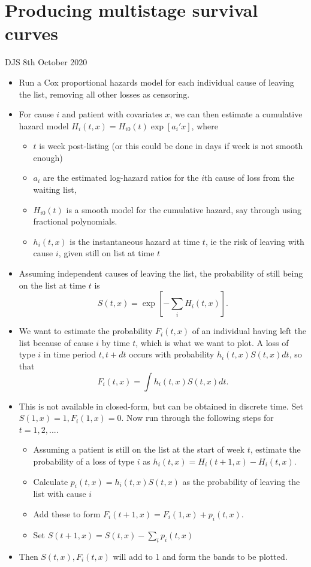\documentclass[12pt]{article}
\begin{document}
\parindent=0pt
\parskip=5pt

\section*{Producing multistage survival curves}
DJS 8th October 2020
\begin{itemize}
\item Run a Cox proportional hazards model for each individual cause of leaving the list, removing all other losses as censoring. 
\item For cause $i$ and patient with covariates $x$, we can then estimate a cumulative hazard model $H_i(t , x) = H_{i0}(t) \exp[ a_i ' x]$, where 
\begin{itemize}
\item $t$ is week post-listing (or this could be done in days if week is not smooth enough)
\item $a_i$ are the estimated log-hazard ratios for the $i$th cause of loss from the waiting list, 
\item  $H_{i0}(t)$ is a smooth model for the cumulative hazard, say through using fractional polynomials.
\item $h_i(t , x)$ is the instantaneous hazard at time $t$, ie the risk of leaving with cause $i$, given still on list at time $t$
\end{itemize}
\item Assuming independent causes of leaving the list, the probability of still being on the list at time $t$ is 
$$ S(t,x) = \exp[ - \sum_i H_i(t , x)].  $$
\item We want to estimate the probability $F_i(t,x)$ of an individual having left the list because of cause $i$ by time $t$, which is what we want to plot.   A loss of type $i$ in time period $t, t+dt$ occurs with probability $  h_i(t , x) S(t,x) dt$, so that 
$$F_i(t,x) = \int h_i(t , x) S(t,x) dt.$$
\item This is not available in closed-form, but can be obtained in discrete time.  Set $S(1,x)=1, F_i(1,x)=0$. Now run through the following steps for $t = 1,2,...$.


\begin{itemize}
\item Assuming a patient is still on the list at the start of week $t$, estimate the probability of a loss of type $i$ as $h_i(t,x) = H_i(t+1 , x) - H_i(t , x) $.  
\item Calculate $p_i(t,x) = h_i(t,x) S(t,x) $ as the probability of leaving the list with cause $i$
\item Add these to form $F_i(t+1,x) = F_i(1,x) + p_i(t,x)$.
\item Set  $S(t+1,x) = S(t,x) - \sum_i p_i(t,x) $
\end{itemize}
\item Then $S(t,x), F_i(t,x)$ will add to 1 and form the bands to be plotted.


\end{itemize}
\end{document}
